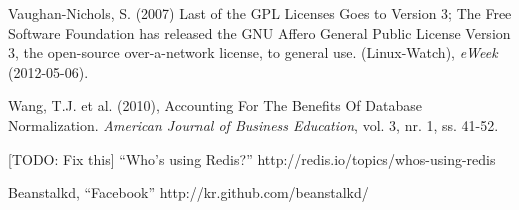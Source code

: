 \begin{flushleft}
Vaughan-Nichols, S. (2007) Last of the GPL Licenses Goes to Version 3; The Free Software Foundation has released the GNU Affero General Public License Version 3, the open-source over-a-network license, to general use. (Linux-Watch), \emph{eWeek} (2012-05-06).

Wang, T.J. et al. (2010), Accounting For The Benefits Of Database Normalization. \emph{American Journal of Business Education}, vol. 3, nr. 1, ss. 41-52.

[TODO: Fix this]
“Who’s using Redis?”
http://redis.io/topics/whos-using-redis

Beanstalkd, “Facebook”
http://kr.github.com/beanstalkd/

\normalsize
\end{flushleft}

